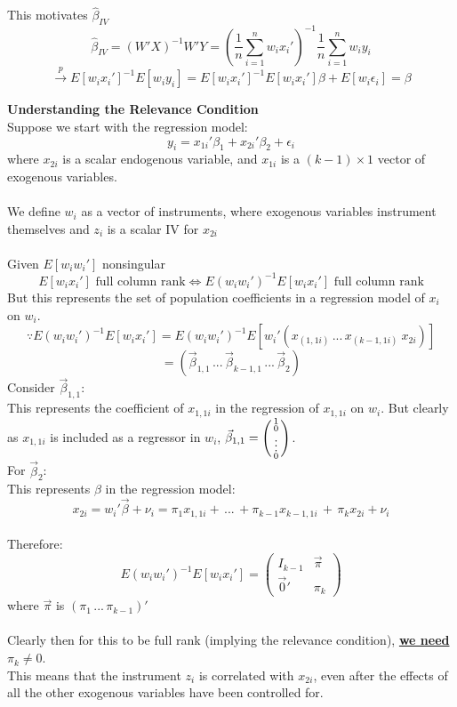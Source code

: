 \documentclass[DIV=14,titlepage=false]{scrreprt}
\begin{document}
This motivates \(\hat\beta_{IV}\)
\[\hat\beta_{IV}=(W'X)^{-1}W'Y=\left(\frac{1}{n}\sum_{i=1}^nw_ix_i'\right)^{-1}\frac{1}{n}\sum_{i=1}^nw_iy_i\]
\[\xrightarrow{p}E[w_ix_i']^{-1}E[w_iy_i]=E[w_ix_i']^{-1}E[w_ix_i']\beta+E[w_i\epsilon_i]=\beta\]
\begin{note} \textbf{Understanding the Relevance Condition} \\
    Suppose we start with the regression model:
    \[y_i=x_{1i}'\beta_1+x_{2i}'\beta_2 + \epsilon_i\]
    where \(x_{2i}\) is a scalar endogenous variable, and \(x_{1i}\) is a \((k-1)\times1\) vector of exogenous variables.
    \\ \\ We define \(w_i\) as a vector of instruments, where exogenous variables instrument themselves and \(z_i\) is a scalar IV for \(x_{2i}\)
    \\ \\ Given \(E[w_iw_i']\) nonsingular
    \[E[w_ix_i'] \text{ full column rank} \iff E(w_iw_i')^{-1}E[w_ix_i']\text{ full column rank}\]
    But this represents the set of population coefficients in a regression model of \(x_i\) on \(w_i\).
    \[\because E(w_iw_i')^{-1}E[w_ix_i']=E(w_iw_i')^{-1}E[w_i'(x_{(1,1i)}\, ...\,x_{(k-1,1i)}\: x_{2i})]\]
    \[=(\vec\beta_{1,1}\, ...\, \vec\beta_{k-1,1}\, ...\, \vec\beta_2)\]
Consider \(\vec\beta_{1,1}\):
\\ This represents the coefficient of \(x_{1,1i}\) in the regression of \(x_{1,1i}\) on \(w_i\).
But clearly as \(x_{1,1i}\) is included as a regressor in \(w_i\), \(\vec\beta_{1,1}=\begin{psmallmatrix} 1 \\ 0 \\ \vdots \\ 0 \end{psmallmatrix}\).
\\ For \(\vec\beta_2\):
\\ This represents \(\beta\) in the regression model:
\[x_{2i}=w_i'\vec\beta+\nu_i= \pi_1x_{1,1i} + \,...\, + \pi_{k-1}x_{k-1,1i} \,+\, \pi_kx_{2i} + \nu_i\]
\\Therefore: \[E(w_iw_i')^{-1}E[w_ix_i']= \begin{pmatrix} I_{k-1} & \vec\pi \\ \vec0' & \pi_k \end{pmatrix}\]
where \(\vec\pi\) is \((\pi_1\, ...\, \pi_{k-1})'\)
\\ \\
Clearly then for this to be full rank (implying the relevance condition), \underline{\textbf{we need \(\pi_k\neq0\)}}.
\\ This means that the instrument \(z_i\) is correlated with \(x_{2i}\), even after the effects of all the other exogenous variables have been controlled for.

\end{note}
\end{document}
